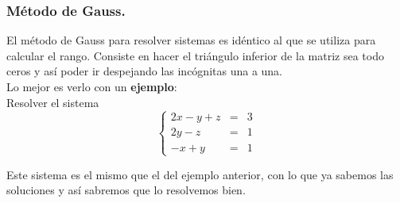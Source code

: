 \documentclass[a4paper,11pt,answers]{exam}
\begin{document}
\subsubsection{Método de Gauss.}
El método de Gauss para resolver sistemas es idéntico al que se utiliza para calcular el rango. Consiste en hacer el triángulo inferior de la matriz sea todo ceros y así poder ir despejando las incógnitas una a una.\\

Lo mejor es verlo con un \textbf{ejemplo}:\\
Resolver el sistema 
\[\left\lbrace\begin{array}{lll}
	2x - y + z &=&3\\
	2y - z &=& 1\\
	-x + y &=& 1
\end{array}\right.\]
\begin{solution}
	Este sistema es el mismo que el del ejemplo anterior, con lo que ya sabemos las soluciones y así sabremos que lo resolvemos bien.\\
	

\end{solution}
\end{document}
